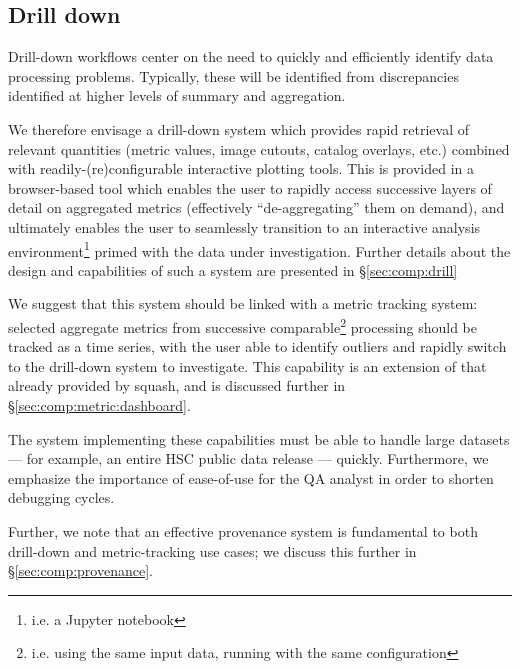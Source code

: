 \subsection{Drill down}
\label{sec:design:drill}

Drill-down workflows center on the need to quickly and efficiently identify
data processing problems. Typically, these will be identified from
discrepancies identified at higher levels of summary and aggregation.

We therefore envisage a drill-down system which provides rapid retrieval of
relevant quantities (metric values, image cutouts, catalog overlays, etc.)
combined with readily-(re)configurable interactive plotting tools. This is
provided in a browser-based tool which enables the user to rapidly access
successive layers of detail on aggregated metrics (effectively
``de-aggregating'' them on demand), and ultimately enables the user to
seamlessly transition to an interactive analysis environment\footnote{i.e. a
Jupyter notebook} primed with the data under investigation. Further details
about the design and capabilities of such a system are presented in
\S\ref{sec:comp:drill}

We suggest that this system should be linked with a metric tracking system:
selected \glspl{aggregate metric} from successive comparable\footnote{i.e.
using the same input data, running with the same configuration} processing
should be tracked as a time series, with the user able to identify outliers
and rapidly switch to the drill-down system to investigate. This capability is
an extension of that already provided by \gls{squash}, and is discussed
further in \S\ref{sec:comp:metric:dashboard}.

The system implementing these capabilities must be able to handle large
datasets --- for example, an entire HSC public data release --- quickly.
Furthermore, we emphasize the importance of ease-of-use for the QA analyst in
order to shorten debugging cycles.

Further, we note that an effective \gls{provenance} system is fundamental to
both drill-down and metric-tracking use cases; we discuss this further in
\S\ref{sec:comp:provenance}.
